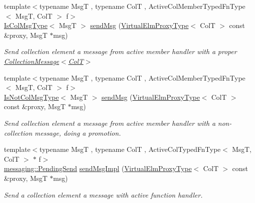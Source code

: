 \begin{DoxyCompactItemize}
{\footnotesize template$<$typename MsgT , typename ColT , Active\+Col\+Member\+Typed\+Fn\+Type$<$ Msg\+T, Col\+T $>$ f$>$ }\\\hyperlink{structvt_1_1vrt_1_1collection_1_1_collection_manager_a21c21612c806016788057aeab142af20}{Is\+Col\+Msg\+Type}$<$ MsgT $>$ \hyperlink{structvt_1_1vrt_1_1collection_1_1_collection_manager_a3ea2d130487c02b8dbda05b7befda88d}{send\+Msg} (\hyperlink{namespacevt_1_1vrt_a620a5c8c59d13e513f690c74b4af516f}{Virtual\+Elm\+Proxy\+Type}$<$ ColT $>$ const \&proxy, MsgT $\ast$msg)
\begin{DoxyCompactList}\small\item\em Send collection element a message from active member handler with a proper {\ttfamily \hyperlink{structvt_1_1vrt_1_1collection_1_1_collection_message}{Collection\+Message$<$\+Col\+T$>$}} \end{DoxyCompactList}\item 
{\footnotesize template$<$typename MsgT , typename ColT , Active\+Col\+Member\+Typed\+Fn\+Type$<$ Msg\+T, Col\+T $>$ f$>$ }\\\hyperlink{structvt_1_1vrt_1_1collection_1_1_collection_manager_ae376deeefd4f89a0b1c93849977715d9}{Is\+Not\+Col\+Msg\+Type}$<$ MsgT $>$ \hyperlink{structvt_1_1vrt_1_1collection_1_1_collection_manager_a229f96a5075562ee92743d69fc285254}{send\+Msg} (\hyperlink{namespacevt_1_1vrt_a620a5c8c59d13e513f690c74b4af516f}{Virtual\+Elm\+Proxy\+Type}$<$ ColT $>$ const \&proxy, MsgT $\ast$msg)
\begin{DoxyCompactList}\small\item\em Send collection element a message from active member handler with a non-\/collection message, doing a promotion. \end{DoxyCompactList}\item 
{\footnotesize template$<$typename MsgT , typename ColT , Active\+Col\+Typed\+Fn\+Type$<$ Msg\+T, Col\+T $>$ $\ast$ f$>$ }\\\hyperlink{structvt_1_1messaging_1_1_pending_send}{messaging\+::\+Pending\+Send} \hyperlink{structvt_1_1vrt_1_1collection_1_1_collection_manager_afc14691c6992cc5d7e51118b1386b67c}{send\+Msg\+Impl} (\hyperlink{namespacevt_1_1vrt_a620a5c8c59d13e513f690c74b4af516f}{Virtual\+Elm\+Proxy\+Type}$<$ ColT $>$ const \&proxy, MsgT $\ast$msg)
\begin{DoxyCompactList}\small\item\em Send a collection element a message with active function handler. \end{DoxyCompactList}\item 

\end{DoxyCompactItemize}
